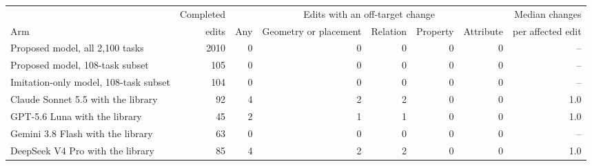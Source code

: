 \begin{tabular}{lrrrrrrr}
\toprule
 & Completed & \multicolumn{5}{c}{Edits with an off-target change} & Median changes \\
\cmidrule(lr){3-7}
Arm & edits & Any & Geometry or placement & Relation & Property & Attribute & per affected edit \\
\midrule
Proposed model, all 2,100 tasks & 2010 & 0 & 0 & 0 & 0 & 0 & -- \\
Proposed model, 108-task subset & 105 & 0 & 0 & 0 & 0 & 0 & -- \\
Imitation-only model, 108-task subset & 104 & 0 & 0 & 0 & 0 & 0 & -- \\
Claude Sonnet 5.5 with the library & 92 & 4 & 2 & 2 & 0 & 0 & 1.0 \\
GPT-5.6 Luna with the library & 45 & 2 & 1 & 1 & 0 & 0 & 1.0 \\
Gemini 3.8 Flash with the library & 63 & 0 & 0 & 0 & 0 & 0 & -- \\
DeepSeek V4 Pro with the library & 85 & 4 & 2 & 2 & 0 & 0 & 1.0 \\
\bottomrule
\end{tabular}

